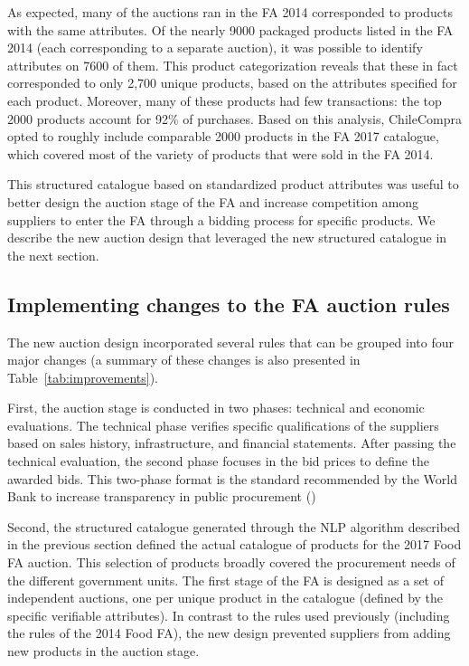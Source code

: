 {As expected, many of the auctions ran in the FA 2014 corresponded to products with the same attributes. Of the nearly 9000 packaged products listed in the FA 2014 (each corresponding to a separate auction), it was possible to identify attributes on 7600 of them.  This product categorization reveals that these in fact corresponded to only 2,700 unique products, based on the attributes specified for each product. {Moreover, many of these products had few transactions: the top 2000 products account for 92\% of purchases. Based on this analysis, ChileCompra opted to roughly include comparable 2000 products in the FA 2017 catalogue, which  covered most of the variety of products that were sold in the FA 2014.} 

This structured catalogue based on standardized product attributes was useful to better design the auction stage of the FA and increase competition among suppliers to enter the FA through a bidding process for {specific products}.  We describe the new auction design that leveraged the new structured catalogue in the next section.}


\subsection{Implementing changes to the FA auction rules}\label{sec:auction_rules_changes}

The new auction design incorporated several rules that can be grouped into four major changes (a summary of these changes is also presented in Table~\ref{tab:improvements}).

First, the auction stage is conducted in two phases: technical and economic evaluations. The technical phase verifies specific qualifications of the suppliers based on sales history, infrastructure, and financial statements. After passing the technical evaluation, the second phase focuses in the bid prices to define the awarded bids. This two-phase format is the standard recommended by the World Bank to increase transparency in public procurement (\cite{worldbank})

Second, the structured catalogue generated through the NLP algorithm described in the previous section defined the actual catalogue of products for the 2017 Food FA auction. This selection of products broadly covered the procurement needs of the different government units. The first  stage of the FA is designed as a set of independent auctions, {one per unique product in the catalogue} (defined by the specific verifiable attributes). In contrast to the rules used previously (including the rules of the 2014 Food FA), the new design prevented suppliers from adding new products in the auction stage.

